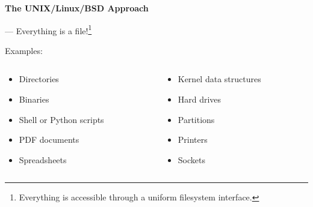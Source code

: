 \begin{frame}

\begin{center}

\Large \textbf{The UNIX/Linux/BSD Approach}

\end{center}

\begin{flushright}

--- Everything is a file!\footnote{Everything is accessible through a uniform
filesystem interface.}

\end{flushright}

Examples:

\begin{columns}[T]

\begin{column}[T]{.5\textwidth}

\begin{itemize}

\item Directories

\item Binaries

\item Shell or Python scripts

\item PDF documents

\item Spreadsheets

\end{itemize}

\end{column}

\hfill

\begin{column}[T]{.5\textwidth}

\begin{itemize}

\item Kernel data structures

\item Hard drives

\item Partitions

\item Printers

\item Sockets

\end{itemize}

\end{column}

\end{columns}

\end{frame}
